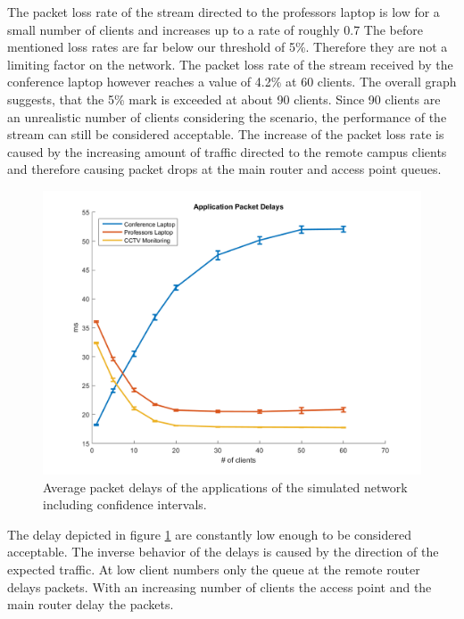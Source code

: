 \documentclass[
10pt, %
a4paper, %
oneside, %
headinclude,footinclude, %
BCOR5mm, %
]{scrartcl}
\begin{document}
The packet loss rate of the stream directed to the professors laptop is low for a small number of clients and increases up to a rate of roughly 0.7%
The before mentioned loss rates are far below our threshold of 5\%. Therefore they are not a limiting factor on the network. The packet loss rate of the stream received by the conference laptop however reaches a value of 4.2\% at 60 clients. The overall graph suggests, that the 5\% mark is exceeded at about 90 clients. Since 90 clients are an unrealistic number of clients considering the scenario, the performance of the stream can still be considered acceptable. The increase of the packet loss rate is caused by the increasing amount of traffic directed to the remote campus clients and therefore causing packet drops at the main router and access point queues.
\begin{figure}[!ht]
  \centering
  \includegraphics[width=\textwidth]{Figures/cctv_application_packet_delays.png}
  \caption{Average packet delays of the applications of the simulated network including confidence intervals.} \label{fig:cctv_app_packet_delays}
\end{figure}
The delay depicted in figure \ref{fig:cctv_app_packet_delays} are constantly low enough to be considered acceptable. The inverse behavior of the delays is caused by the direction of the expected traffic. At low client numbers only the queue at the remote router delays packets. With an increasing number of clients the access point and the main router delay the packets.
\end{document}
